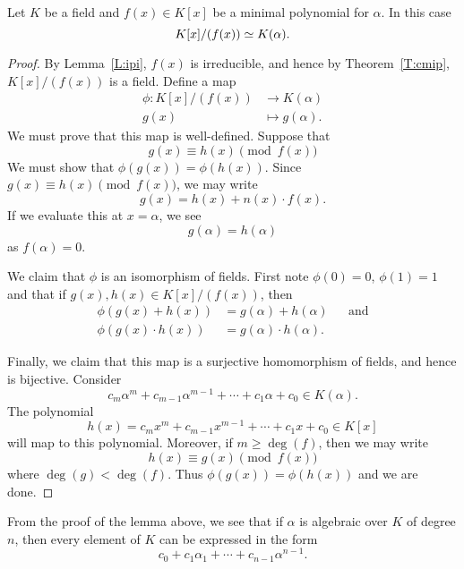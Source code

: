 \documentclass{ximera}
\begin{document}
\begin{lemma}
  Let $K$ be a field and $f(x)\in K[x]$ be a minimal polynomial for
  $\alpha$. In this case
  \[
  K[x]/(f(x))\simeq K(\alpha). 
  \]
  \begin{proof}
    By Lemma~\ref{L:ipi}, $f(x)$ is irreducible, and hence by
    Theorem~\ref{T:cmip}, $K[x]/(f(x))$ is a field. Define a map
    \begin{align*}
    \phi:K[x]/(f(x)) &\to K(\alpha)\\
    g(x) &\mapsto g(\alpha).
    \end{align*}
    We must prove that this map is well-defined.
    Suppose that
    \[
    g(x) \equiv h(x) \pmod{f(x)}
    \]
    We must show that $\phi(g(x)) = \phi(h(x))$. Since $g(x) \equiv
    h(x) \pmod{f(x)}$, we may write
    \[
    g(x) = h(x) + n(x) \cdot f(x).
    \]
    If we evaluate this at $x= \alpha$, we see
    \[
    g(\alpha) = h(\alpha)
    \]
    as $f(\alpha) = 0$.

    We claim that $\phi$ is an isomorphism of fields. First note
    $\phi(0) = 0$, $\phi(1) = 1$ and that if $g(x),h(x)\in
    K[x]/(f(x))$, then
    \begin{align*}
      \phi(g(x) + h(x)) &= g(\alpha) + h(\alpha) & &\text{and}\\
      \phi(g(x) \cdot h(x)) &= g(\alpha)\cdot h(\alpha). & &
    \end{align*}


    Finally, we claim that this map is a surjective homomorphism of
    fields, and hence is bijective. Consider
    \[
    c_m\alpha^m + c_{m-1}\alpha^{m-1} + \cdots + c_1\alpha + c_0\in
    K(\alpha).
    \]
    The polynomial
    \[
    h(x) = c_m x^m + c_{m-1} x^{m-1} + \cdots + c_1x  + c_0\in
    K[x]
    \]
    will map to this polynomial. Moreover, if $m\ge \deg(f)$, then
    we may write
    \[
    h(x) \equiv g(x) \pmod{f(x)}
    \]
    where $\deg(g)< \deg(f)$. Thus $\phi(g(x)) =\phi(h(x))$ and
    we are done.
  \end{proof}
\end{lemma}


\begin{remark}
From the proof of the lemma above, we see that if $\alpha$ is
algebraic over $K$ of degree $n$, then every element of $K$ can be
expressed in the form
\[
c_0 + c_1\alpha_1 + \cdots + c_{n-1}\alpha^{n-1}.
\]
\end{remark}
\end{document}
